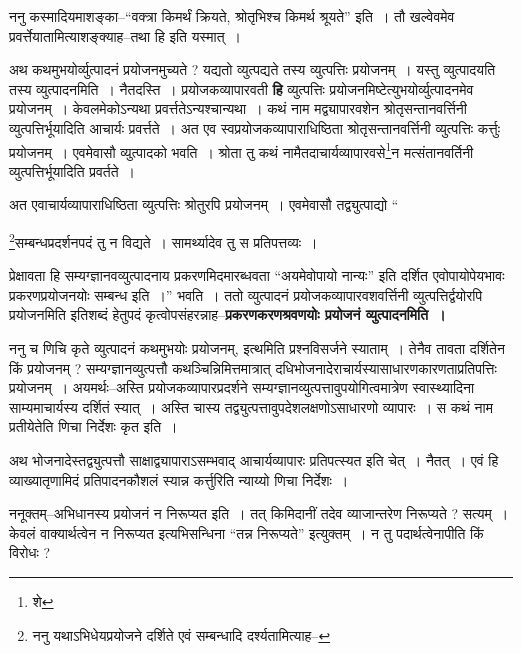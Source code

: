 \documentclass[article,12pt,a4paper]{memoir}
\begin{document}
	  \pstart ननु कस्मादियमाशङ्का--“वक्त्रा किमर्थं क्रियते, श्रोतृभिश्च किमर्थ श्रूयते” इति । तौ खल्वेवमेव प्रवर्त्तेयातामित्याशङ्क्याह--तथा हि इति यस्मात् ।
	\pend
      

	  \pstart अथ कथमुभयोर्व्युत्पादनं प्रयोजनमुच्यते ? यद्यतो व्युत्पद्यते तस्य व्युत्पत्तिः प्रयोजनम् । यस्तु व्युत्पादयति तस्य व्युत्पादनमिति । नैतदस्ति । प्रयोजकव्यापारवती \textbf{हि} व्युत्पत्तिः प्रयोजनमिष्टेत्युभयोर्व्युत्पादनमेव प्रयोजनम् । केवलमेकोऽन्यथा प्रवर्त्ततेऽन्यश्चान्यथा । कथं नाम मद्व्यापारवशेन श्रोतृसन्तानवर्त्तिनी व्युत्पत्तिर्भूयादिति आचार्यः प्रवर्त्तते । अत एव स्वप्रयोजकव्यापाराधिष्ठिता श्रोतृसन्तानवर्त्तिनी व्युत्पत्तिः कर्त्तुः प्रयोजनम् । एवमेवासौ व्युत्पादको भवति । श्रोता तु कथं नामैतदाचार्यव्यापारवसे\footnote{शे}न मत्संतानवर्तिनी व्युत्पत्तिर्भूयादिति प्रवर्तते ।
	\pend
      

	  \pstart अत एवाचार्यव्यापाराधिष्ठिता व्युत्पत्तिः श्रोतुरपि प्रयोजनम् । एवमेवासौ तद्व्युत्पाद्यो  \leavevmode{} “
	  
	\footnote{ननु यथाऽभिधेयप्रयोजने दर्शिते एवं सम्बन्धादि दर्श्यतामित्याह--\cite{dp-msD-n}}सम्बन्धप्रदर्शनपदं तु न विद्यते । सामर्थ्यादेव तु स प्रतिपत्तव्यः । 
	  
	प्रेक्षावता हि सम्यग्ज्ञानवव्युत्पादनाय प्रकरणमिदमारब्धवता “अयमेवोपायो नान्यः” इति दर्शित एवोपायोपेयभावः प्रकरणप्रयोजनयोः सम्बन्ध इति ।” भवति । ततो व्युत्पादनं प्रयोजकव्यापारवशवर्त्तिनी व्युत्पत्तिर्द्वयोरपि प्रयोजनमिति इतिशब्दं हेतुपदं कृत्वोपसंहरन्नाह--\textbf{प्रकरणकरणश्रवणयोः प्रयोजनं व्युत्पादनमिति ।}
	\pend
      

	  \pstart ननु च णिचि कृते व्युत्पादनं कथमुभयोः प्रयोजनम्, इत्थमिति \leavevmode{} प्रश्नविसर्जने स्याताम् । तेनैव तावता दर्शितेन किं प्रयोजनम् ? सम्यग्ज्ञानव्युत्पत्तौ कथञ्चिन्निमित्तमात्रात् दधिभोजनादेराचार्यस्यासाधारणकारणताप्रतिपत्तिः प्रयोजनम् । अयमर्थः--अस्ति प्रयोजकव्यापारप्रदर्शने सम्यग्ज्ञानव्युत्पत्तावुपयोगित्वमात्रेण स्वास्थ्यादिना साम्यमाचार्यस्य दर्शितं स्यात् । अस्ति चास्य तद्व्युत्पत्तावुपदेशलक्षणोऽसाधारणो व्यापारः । स कथं नाम प्रतीयेतेति णिचा निर्देशः कृत इति ।
	\pend
      

	  \pstart अथ भोजनादेस्तद्व्युत्पत्तौ साक्षाद्व्यापाराऽसम्भवाद् आचार्यव्यापारः प्रतिपत्स्यत इति चेत् । नैतत् । एवं हि व्याख्यातृणामिदं प्रतिपादनकौशलं स्यान्न कर्त्तुरिति न्याय्यो णिचा निर्देशः ।
	\pend
      

	  \pstart ननूक्तम्--अभिधानस्य प्रयोजनं न निरूप्यत इति । तत् किमिदानीं तदेव व्याजान्तरेण निरूप्यते ? सत्यम् । केवलं वाक्यार्थत्वेन न निरूप्यत इत्यभिसन्धिना “तन्न निरूप्यते” इत्युक्तम् । न तु पदार्थत्वेनापीति किं विरोधः ?
	\pend
      
\end{document}
